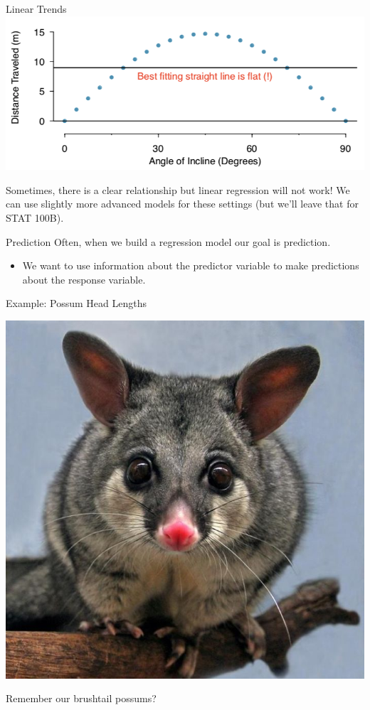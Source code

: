 \begin{frame}{Linear Trends}
    \includegraphics[scale=0.4]{images/curvereg.png}
    
    Sometimes, there is a clear relationship but linear regression will not work! We can use slightly more advanced models for these settings (but we'll leave that for STAT 100B).
\end{frame}

\begin{frame}{Prediction}
    Often, when we build a regression model our goal is prediction.
    \begin{itemize}
        \item We want to use information about the predictor variable to make predictions about the response variable.
    \end{itemize}
\end{frame}

\begin{frame}{Example: Possum Head Lengths}
    \begin{center}
        \includegraphics[scale=0.25]{images/possum.jpg}
    \end{center}
    Remember our brushtail possums?
\end{frame}


